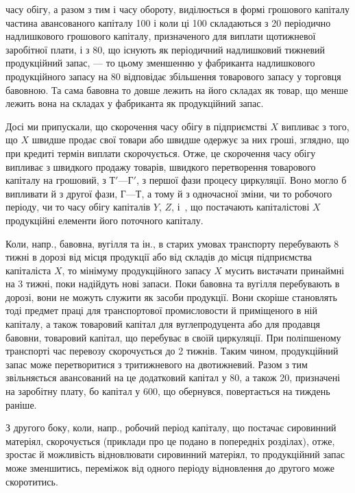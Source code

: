 \parcont{}  %
часу обігу, а разом з тим і часу обороту, виділюється в формі грошового
капіталу  частина авансованого капіталу \deq{} 100 і коли
ці 100 складаються з 20 періодично надлишкового
грошового капіталу, призначеного для виплати щотижневої заробітної
плати, і з 80, що існують як періодичний надлишковий тижневий
продукційний запас, — то цьому зменшенню у фабриканта надлишкового
продукційного запасу на 80 відповідає збільшення товарового
запасу у торговця бавовною. Та сама бавовна то довше лежить
на його складах як товар, що менше лежить вона на складах у фабриканта
як продукційний запас.

Досі ми припускали, що скорочення часу обігу в підприємстві $X$ випливає
з того, що $X$ швидше продає свої товари або швидше одержує
за них гроші, зглядно, що при кредиті термін виплати скорочується.
Отже, це скорочення часу обігу випливає з швидкого продажу товарів,
швидкого перетворення товарового капіталу на грошовий, з $Т' — Г'$, з
першої фази процесу циркуляції. Воно могло б випливати й з другої фази,
$Г — Т$, а тому й з одночасної зміни, чи то робочого періоду, чи то часу
обігу капіталів $Y$, $Z$, і~, що постачають капіталістові $X$ продукційні
елементи його поточного капіталу.

Коли, напр., бавовна, вугілля та ін., в старих умовах транспорту перебувають
8 тижні в дорозі від місця продукції або від складів до місця
підприємства капіталіста $X$, то мінімуму продукційного запасу $X$ мусить
вистачати принаймні на 3 тижні, поки надійдуть нові запаси. Поки
бавовна та вугілля перебувають в дорозі, вони не можуть служити як
засоби продукції. Вони скоріше становлять тоді предмет праці для транспортової
промисловости й приміщеного в ній капіталу, а також товаровий
капітал для вуглепродуцента або для продавця бавовни, товаровий капітал,
що перебуває в своїй циркуляції. При поліпшеному транспорті час
перевозу скорочується до 2 тижнів. Таким чином, продукційний запас може
перетворитися з тритижневого на двотижневий. Разом з тим звільняється
авансований на це додатковий капітал у 80, а також 20, призначені на заробітну плату, бо капітал у 600,
що обернувся, повертається на тиждень раніше.

З другого боку, коли, напр., робочий період капіталу, що постачає
сировинний матеріял, скорочується (приклади про це подано в попередніх
розділах), отже, зростає й можливість відновлювати сировинний матеріял,
то продукційний запас може зменшитись, переміжок від одного періоду
відновлення до другого може скоротитись.

